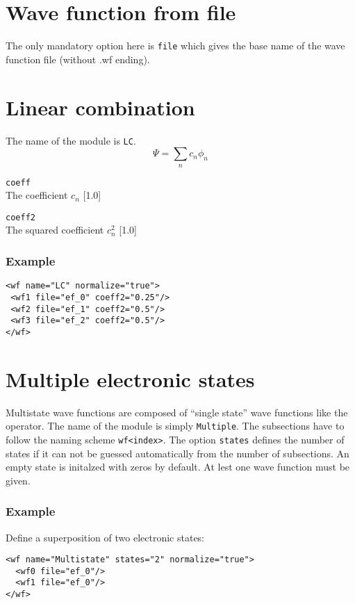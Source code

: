\documentclass[a4paper,12pt]{scrbook}
\newcommand{\option}[2]{\item \texttt{#1}\\ #2}
\begin{document}
\section{Wave function from file}
The only mandatory option here is \verb|file| which gives the base name of the wave function file
(without .wf ending).

\section{Linear combination}
The name of the module is \verb|LC|.
\begin{equation}
 \Psi = \sum_n c_n \phi_n
\end{equation}

\begin{options}
 \option{coeff}{The coefficient $c_n$ [1.0]}
 \option{coeff2}{The squared coefficient $c^2_n$ [1.0]}
\end{options}

\subsubsection*{Example}
\begin{verbatim}
<wf name="LC" normalize="true">
 <wf1 file="ef_0" coeff2="0.25"/>
 <wf2 file="ef_1" coeff2="0.5"/>
 <wf3 file="ef_2" coeff2="0.5"/>
</wf>
\end{verbatim}


\section{Multiple electronic states}
\label{sec:WFMultistate}

Multistate wave functions are composed of ``single state'' wave functions like the operator.
The name of the module is simply \verb|Multiple|. The subsections have to follow the naming
scheme \verb|wf<index>|. The option \verb|states| defines the number of states if it can not
be guessed automatically from the number of subsections. An empty state is initalzed with zeros
by default. At lest one wave function must be given.

\subsubsection*{Example}
Define a superposition of two electronic states:
\begin{verbatim}
<wf name="Multistate" states="2" normalize="true">
  <wf0 file="ef_0"/>
  <wf1 file="ef_0"/>
</wf>
\end{verbatim}
\end{document}
